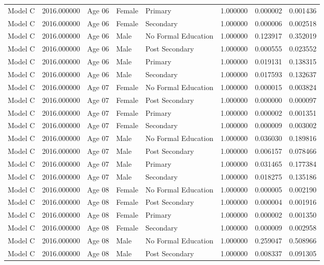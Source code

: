 \begin{table}[ht]
\begin{tabular}{lrlllrrr}
Model C & 2016.000000 & Age 06 & Female & Primary & 1.000000 & 0.000002 & 0.001436 \\
Model C & 2016.000000 & Age 06 & Female & Secondary & 1.000000 & 0.000006 & 0.002518 \\
Model C & 2016.000000 & Age 06 & Male & No Formal Education & 1.000000 & 0.123917 & 0.352019 \\
Model C & 2016.000000 & Age 06 & Male & Post Secondary & 1.000000 & 0.000555 & 0.023552 \\
Model C & 2016.000000 & Age 06 & Male & Primary & 1.000000 & 0.019131 & 0.138315 \\
Model C & 2016.000000 & Age 06 & Male & Secondary & 1.000000 & 0.017593 & 0.132637 \\
Model C & 2016.000000 & Age 07 & Female & No Formal Education & 1.000000 & 0.000015 & 0.003824 \\
Model C & 2016.000000 & Age 07 & Female & Post Secondary & 1.000000 & 0.000000 & 0.000097 \\
Model C & 2016.000000 & Age 07 & Female & Primary & 1.000000 & 0.000002 & 0.001351 \\
Model C & 2016.000000 & Age 07 & Female & Secondary & 1.000000 & 0.000009 & 0.003002 \\
Model C & 2016.000000 & Age 07 & Male & No Formal Education & 1.000000 & 0.036030 & 0.189816 \\
Model C & 2016.000000 & Age 07 & Male & Post Secondary & 1.000000 & 0.006157 & 0.078466 \\
Model C & 2016.000000 & Age 07 & Male & Primary & 1.000000 & 0.031465 & 0.177384 \\
Model C & 2016.000000 & Age 07 & Male & Secondary & 1.000000 & 0.018275 & 0.135186 \\
Model C & 2016.000000 & Age 08 & Female & No Formal Education & 1.000000 & 0.000005 & 0.002190 \\
Model C & 2016.000000 & Age 08 & Female & Post Secondary & 1.000000 & 0.000004 & 0.001916 \\
Model C & 2016.000000 & Age 08 & Female & Primary & 1.000000 & 0.000002 & 0.001350 \\
Model C & 2016.000000 & Age 08 & Female & Secondary & 1.000000 & 0.000009 & 0.002958 \\
Model C & 2016.000000 & Age 08 & Male & No Formal Education & 1.000000 & 0.259047 & 0.508966 \\
Model C & 2016.000000 & Age 08 & Male & Post Secondary & 1.000000 & 0.008337 & 0.091305 \\

\end{tabular}
\end{table}
